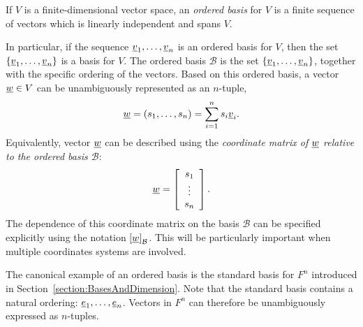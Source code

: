 \begin{definition}
If $V$ is a finite-dimensional vector space, an \emph{ordered basis} for $V$ is a finite sequence of vectors which is linearly independent and spans $V$.
\end{definition}

In particular, if the sequence $\underline{v}_1, \ldots, \underline{v}_n$ is an ordered basis for $V$, then the set $\left\{ \underline{v}_1, \ldots, \underline{v}_n \right\}$ is a basis for $V$.
The ordered basis $\mathcal{B}$ is the set $\left\{ \underline{v}_1, \ldots, \underline{v}_n \right\}$, together with the specific ordering of the vectors.
Based on this ordered basis, a vector $\underline{w} \in V$ can be unambiguously represented as an $n$-tuple,
\begin{equation*}
\underline{w} = (s_1, \ldots, s_n) = \sum_{i=1}^n s_i \underline{v}_i.
\end{equation*}
Equivalently, vector $\underline{w}$ can be described using the \emph{coordinate matrix of $\underline{w}$ relative to the ordered basis $\mathcal{B}$}:
\begin{equation*}
\underline{w} = \left[ \begin{array}{c} s_1 \\ \vdots \\ s_n \end{array} \right].
\end{equation*}
The dependence of this coordinate matrix on the basis $\mathcal{B}$ can be specified explicitly using the notation $\left[ \underline{w} \right]_{\mathcal{B}}$.
This will be particularly important when multiple coordinates systems are involved.

\begin{example}
The canonical example of an ordered basis is the standard basis for $F^n$ introduced in Section~\ref{section:BasesAndDimension}.
Note that the standard basis contains a natural ordering: $\underline{e}_1, \ldots, \underline{e}_n$.
Vectors in $F^n$ can therefore be unambiguously expressed as $n$-tuples.
\end{example}

